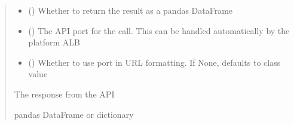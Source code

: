 \documentclass[letterpaper,10pt,english]{sphinxmanual}
\begin{document}
\begin{fulllineitems}
\begin{fulllineitems}
\begin{quote}
\begin{description}
\begin{itemize}
\item {} 
\sphinxAtStartPar
{} (\sphinxstyleliteralemphasis{\sphinxupquote{ (}}\sphinxstyleliteralemphasis{\sphinxupquote{)}}) \textendash{} Whether to return the result as a pandas DataFrame

\item {} 
\sphinxAtStartPar
{} (\sphinxstyleliteralemphasis{\sphinxupquote{ (}}\sphinxstyleliteralemphasis{\sphinxupquote{)}}) \textendash{} The API port for the call. This can be handled automatically by the platform ALB

\item {} 
\sphinxAtStartPar
{} (\sphinxstyleliteralemphasis{\sphinxupquote{ (}}\sphinxstyleliteralemphasis{\sphinxupquote{)}}) \textendash{} Whether to use port in URL formatting. If None, defaults to class value

\end{itemize}

\sphinxAtStartPar
{} \textendash{} The response from the API

\sphinxAtStartPar
pandas DataFrame or dictionary

\end{description}\end{quote}

\end{fulllineitems}



\end{fulllineitems}
\end{document}
